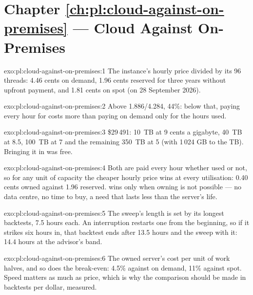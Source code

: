 \section*{Chapter \ref{ch:pl:cloud-against-on-premises} --- Cloud Against On-Premises}

\begin{solution}{exo:pl:cloud-against-on-premises:1}
The instance's hourly price divided by its 96 threads: 4.46 cents on demand, 1.96 cents reserved for three years without upfront payment, and
1.81 cents on spot (on 28 September 2026).
\end{solution}

\begin{solution}{exo:pl:cloud-against-on-premises:2}
Above 1.886/4.284, 44\%: below that, paying every hour for  costs more than paying on demand only for the hours used.
\end{solution}

\begin{solution}{exo:pl:cloud-against-on-premises:3}
\$29\,491: 10~TB at 9 cents a gigabyte, 40~TB at 8.5, 100~TB at 7 and the remaining 350~TB at 5 (with 1\,024 GB to the TB). Bringing it in was
free.
\end{solution}

\begin{solution}{exo:pl:cloud-against-on-premises:4}
Both are paid every hour whether used or not, so for any unit of capacity the cheaper hourly price wins at every utilisation: 0.40 cents owned
against 1.96 reserved.  wins only when owning is not possible --- no data centre, no time to buy, a need that lasts less than
the server's life.
\end{solution}

\begin{solution}{exo:pl:cloud-against-on-premises:5}
The sweep's length is set by its longest backtests, 7.5 hours each. An interruption restarts one from the beginning, so if it strikes six hours
in, that backtest ends after 13.5 hours and the sweep with it: 14.4 hours at the advisor's band.
\end{solution}

\begin{solution}{exo:pl:cloud-against-on-premises:6}
The owned server's cost per unit of work halves, and so does the break-even: 4.5\% against on demand, 11\% against spot. Speed matters as much
as price, which is why the comparison should be made in backtests per dollar, measured.
\end{solution}

